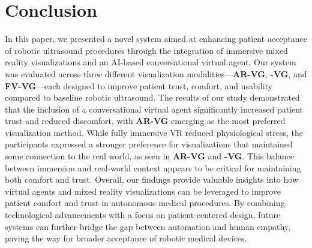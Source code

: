 \section{Conclusion}\label{Conclusion}

In this paper, we presented a novel system aimed at enhancing patient acceptance of robotic ultrasound procedures through the integration of immersive mixed reality visualizations and an AI-based conversational virtual agent. Our system was evaluated across three different visualization modalities—\textbf{AR-VG}, \textbf{-VG}, and \textbf{FV-VG}—each designed to improve patient trust, comfort, and usability compared to baseline robotic ultrasound.
The results of our study demonstrated that the inclusion of a conversational virtual agent significantly increased patient trust and reduced discomfort, with \textbf{AR-VG} emerging as the most preferred visualization method. While fully immersive VR reduced physiological stress, the participants expressed a stronger preference for visualizations that maintained some connection to the real world, as seen in \textbf{AR-VG} and \textbf{-VG}. This balance between immersion and real-world context appears to be critical for maintaining both comfort and trust.
Overall, our findings provide valuable insights into how virtual agents and mixed reality visualizations can be leveraged to improve patient comfort and trust in autonomous medical procedures. By combining technological advancements with a focus on patient-centered design, future systems can further bridge the gap between automation and human empathy, paving the way for broader acceptance of robotic medical devices.
